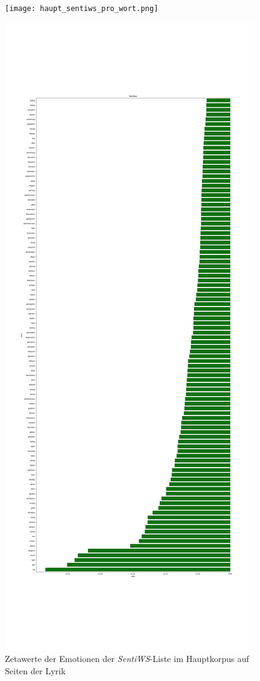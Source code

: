 \documentclass[a4paper,10p]{article}
\begin{document}
\begin{figure}{}
    \centering
    \begin{minipage}[b]{.45\linewidth}
        \centering
        \texttt{[image: haupt\_sentiws\_pro\_wort.png]}
        \caption{Zetawerte der Emotionen der \textit{SentiWS}-Liste im Hauptkorpus auf Seiten der Lyrik}
        \label{haupt_sentiws}
    \end{minipage}
    \hfill
    \begin{minipage}[b]{.45\linewidth}
        \centering
        \includegraphics[width=\linewidth]{haupt_sentiws_pro_wort2.png}

\end{minipage}
\end{figure}
\end{document}
